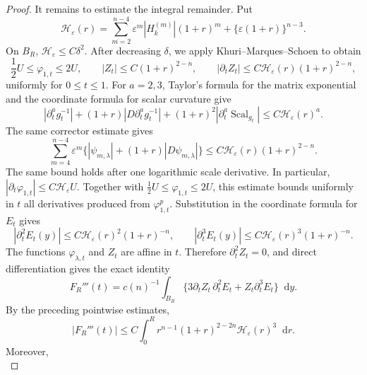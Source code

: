 \documentclass[11pt]{article}
\numberwithin{equation}{section}
\theoremstyle{remark}
\newcommand{\dd}{\mathop{}\!\mathrm{d}}
\begin{document}
\begin{proof}
 It remains to estimate the integral remainder.  Put
{
\begin{equation*}
 \mathcal H_\varepsilon(r)
 =\sum_{m=2}^{n-4}\varepsilon^m|H_k^{(m)}|(1+r)^m
 +\{\varepsilon(1+r)\}^{n-3}.
\end{equation*}
}
On $B_R$, $\mathcal H_\varepsilon\le C\delta^2$.
After decreasing $\delta$, we apply
Khuri--Marques--Schoen \cite[(4.4)]{KMS} to obtain
\begin{equation*}
 \frac12U\le\varphi_{1,t}\le2U,
 \qquad
 |Z_t|\le C(1+r)^{2-n},
 \qquad
 |\partial_tZ_t|\le
 C\mathcal H_\varepsilon(r)(1+r)^{2-n},
\end{equation*}
uniformly for $0\le t\le1$.
 For $a=2,3$, Taylor's formula
for the matrix exponential and the coordinate formula for scalar
curvature give
{
\begin{equation*}
 |\partial_t^ag_t^{-1}|+(1+r)|D\partial_t^ag_t^{-1}|
 +(1+r)^2|\partial_t^a\operatorname{Scal}_{g_t}|
 \le C\mathcal H_\varepsilon(r)^a.
\end{equation*}
}
 The same corrector estimate gives
{
\begin{equation*}
 \sum_{m=4}^{n-4}\varepsilon^m
 \bigl\{|\psi_{m,\lambda}|+(1+r)|D\psi_{m,\lambda}|\bigr\}
 \le C\mathcal H_\varepsilon(r)(1+r)^{2-n}.
\end{equation*}
}
The same bound holds after one logarithmic scale derivative.  In
particular,
$|\partial_t\varphi_{1,t}|\le C\mathcal H_\varepsilon U$.
Together with
$\frac{1}{2}U\le\varphi_{1,t}\le2U$, this estimate bounds uniformly in
$t$ all derivatives produced from $\varphi_{1,t}^p$.  Substitution in
the coordinate formula for $E_t$ gives
{
\begin{equation*}
 |\partial_t^2E_t(y)|
 \le C\mathcal H_\varepsilon(r)^2(1+r)^{-n},
 \qquad
 |\partial_t^3E_t(y)|
 \le C\mathcal H_\varepsilon(r)^3(1+r)^{-n}.
\end{equation*}
}
The functions $\varphi_{\lambda,t}$ and $Z_t$ are affine in $t$.
Therefore $\partial_t^2Z_t=0$, and direct differentiation gives the
exact identity
{
\begin{equation*}
 F_R'''(t)=c(n)^{-1}\int_{B_R}
 \bigl\{3\partial_tZ_t\,\partial_t^2E_t
       +Z_t\partial_t^3E_t\bigr\}\dd y.
\end{equation*}
}
{By the preceding pointwise estimates,}
{
\begin{equation*}
 |F_R'''(t)|
 \le C\int_0^Rr^{n-1}(1+r)^{2-2n}
 \mathcal H_\varepsilon(r)^3\dd r.
\end{equation*}
}
Moreover,
{
\begin{equation*}

\end{equation*}}
\end{proof}
\end{document}
